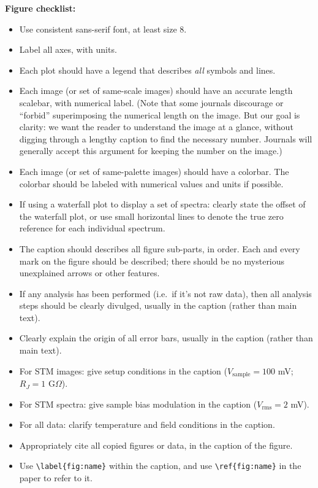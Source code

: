 \documentclass[aps,prb,twocolumn,superscriptaddress,floatfix,longbibliography]{revtex4-2}
\begin{document}
\vspace{3mm}
\noindent \textbf{Figure checklist:}
\vspace{-3mm}
\begin{itemize}[label=$\Box$]
\item Use consistent sans-serif font, at least size 8.
\item Label all axes, with units.
\item Each plot should have a legend that describes {\em all} symbols and lines.
\item Each image (or set of same-scale images) should have an accurate length scalebar, with numerical label. (Note that some journals discourage or ``forbid'' superimposing the numerical length on the image. But our goal is clarity: we want the reader to understand the image at a glance, without digging through a lengthy caption to find the necessary number. Journals will generally accept this argument for keeping the number on the image.)
\item Each image (or set of same-palette images) should have a colorbar. The colorbar should be labeled with numerical values and units if possible.
\item If using a waterfall plot to display a set of spectra: clearly state the offset of the waterfall plot, or use small horizontal lines to denote the true zero reference for each individual spectrum.
\item The caption should describes all figure sub-parts, in order. Each and every mark on the figure should be described; there should be no mysterious unexplained arrows or other features.
\item If any analysis has been performed (i.e.\ if it's not raw data), then all analysis steps should be clearly divulged, usually in the caption (rather than main text).
\item Clearly explain the origin of all error bars, usually in the caption (rather than main text).
\item For STM images: give setup conditions in the caption ($V_\mathrm{sample}=100$ mV; $R_J=1$ G$\Omega$).
\item For STM spectra: give sample bias modulation in the caption ($V_\mathrm{rms}=2$ mV).
\item For all data: clarify temperature and field conditions in the caption.
\item Appropriately cite all copied figures or data, in the caption of the figure.
\item Use {\tt \textbackslash label\{fig:name\}} within the caption, and use {\tt \textbackslash ref\{fig:name\}} in the paper to refer to it.

\end{itemize}
\end{document}
